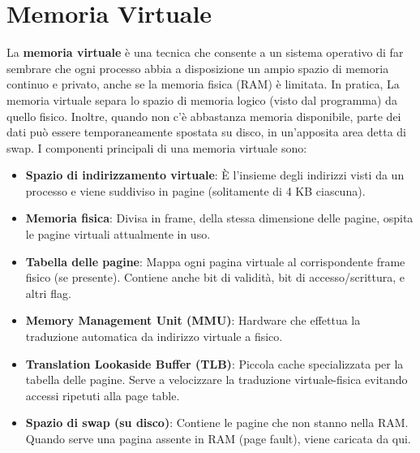 \section{Memoria Virtuale}
La \textbf{memoria virtuale} è una tecnica che consente a un sistema operativo di far sembrare che ogni processo abbia a disposizione un ampio spazio di memoria continuo e privato, anche se la memoria fisica (RAM) è limitata. In pratica, La memoria virtuale separa lo spazio di memoria logico (visto dal programma) da quello fisico. Inoltre, quando non c'è abbastanza memoria disponibile, parte dei dati può essere temporaneamente spostata su disco, in un'apposita area detta di swap. I componenti principali di una memoria virtuale sono:
\begin{itemize}
    \item \textbf{Spazio di indirizzamento virtuale}: \MakeUppercase{è} l'insieme degli indirizzi visti da un processo e viene suddiviso in pagine (solitamente di 4 KB ciascuna).
    \item \textbf{Memoria fisica}: Divisa in frame, della stessa dimensione delle pagine, ospita le pagine virtuali attualmente in uso.
    \item \textbf{Tabella delle pagine}: Mappa ogni pagina virtuale al corrispondente frame fisico (se presente). Contiene anche bit di validità, bit di accesso/scrittura, e altri flag.
    \item \textbf{Memory Management Unit (MMU)}: Hardware che effettua la traduzione automatica da indirizzo virtuale a fisico.
    \item \textbf{Translation Lookaside Buffer (TLB)}: Piccola cache specializzata per la tabella delle pagine. Serve a velocizzare la traduzione virtuale-fisica evitando accessi ripetuti alla page table.
    \item \textbf{Spazio di swap (su disco)}: Contiene le pagine che non stanno nella RAM. Quando serve una pagina assente in RAM (page fault), viene caricata da qui.
\end{itemize}

